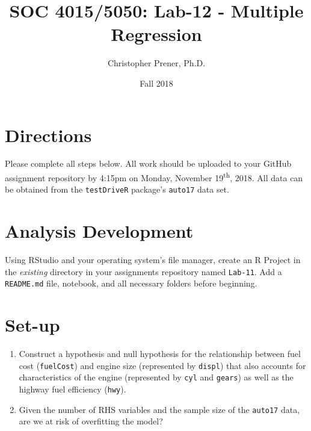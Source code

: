 \documentclass{tufte-handout}
\title{SOC 4015/5050: Lab-12 - Multiple Regression}
\author{Christopher Prener, Ph.D.}
\date{Fall 2018}
\begin{document}

\maketitle %


\vspace{5mm}
\section{Directions}
Please complete all steps below. All work should be uploaded to your GitHub assignment repository by 4:15pm on Monday, November 19\textsuperscript{th}, 2018. All data can be obtained from the \texttt{testDriveR} package's \texttt{auto17} data set.

\vspace{5mm}
\section{Analysis Development}
Using RStudio and your operating system's file manager, create an R Project in the \textit{existing} directory in your assignments repository named \texttt{Lab-11}. Add a \texttt{README.md} file, notebook, and all necessary folders before beginning.

\vspace{5mm}
\section{Set-up}
\begin{enumerate}
\item Construct a hypothesis and null hypothesis for the relationship between fuel cost (\texttt{fuelCost}) and engine size (represented by \texttt{displ}) that also accounts for characteristics of the engine (represented by \texttt{cyl} and \texttt{gears}) as well as the highway fuel efficiency (\texttt{hwy}).
\item Given the number of RHS variables and the sample size of the \texttt{auto17} data, are we at risk of overfitting the model?
\end{enumerate}

\vspace{3mm}
\end{document}

